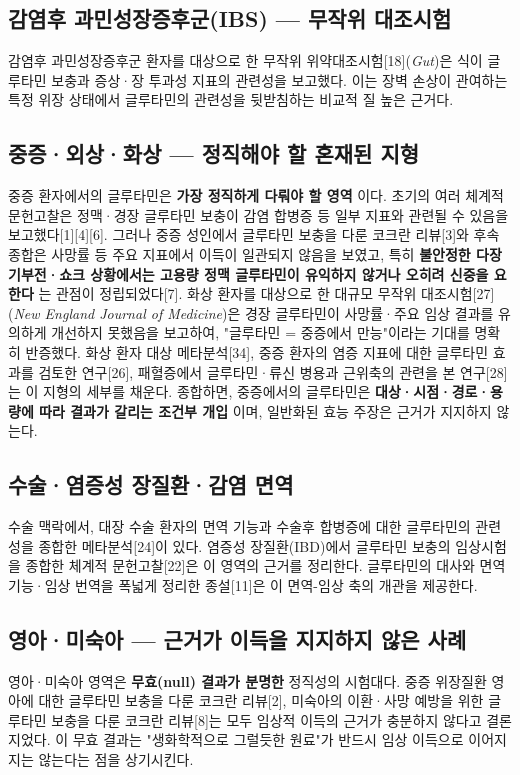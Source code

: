 \documentclass[11pt,oneside]{book}
\begin{document}
\subsection{감염후 과민성장증후군(IBS) — 무작위 대조시험}
감염후 과민성장증후군 환자를 대상으로 한 무작위 위약대조시험[18](\textit{Gut})은 식이 글루타민 보충과 증상·장 투과성 지표의 관련성을 보고했다. 이는 장벽 손상이 관여하는 특정 위장 상태에서 글루타민의 관련성을 뒷받침하는 비교적 질 높은 근거다.

\subsection{중증·외상·화상 — 정직해야 할 혼재된 지형}
중증 환자에서의 글루타민은 \textbf{가장 정직하게 다뤄야 할 영역} 이다. 초기의 여러 체계적 문헌고찰은 정맥·경장 글루타민 보충이 감염 합병증 등 일부 지표와 관련될 수 있음을 보고했다[1][4][6]. 그러나 중증 성인에서 글루타민 보충을 다룬 코크란 리뷰[3]와 후속 종합은 사망률 등 주요 지표에서 이득이 일관되지 않음을 보였고, 특히 \textbf{불안정한 다장기부전·쇼크 상황에서는 고용량 정맥 글루타민이 유익하지 않거나 오히려 신중을 요한다} 는 관점이 정립되었다[7]. 화상 환자를 대상으로 한 대규모 무작위 대조시험[27](\textit{New England Journal of Medicine})은 경장 글루타민이 사망률·주요 임상 결과를 유의하게 개선하지 못했음을 보고하여, "글루타민 = 중증에서 만능"이라는 기대를 명확히 반증했다. 화상 환자 대상 메타분석[34], 중증 환자의 염증 지표에 대한 글루타민 효과를 검토한 연구[26], 패혈증에서 글루타민·류신 병용과 근위축의 관련을 본 연구[28]는 이 지형의 세부를 채운다. 종합하면, 중증에서의 글루타민은 \textbf{대상·시점·경로·용량에 따라 결과가 갈리는 조건부 개입} 이며, 일반화된 효능 주장은 근거가 지지하지 않는다.

\subsection{수술·염증성 장질환·감염 면역}
수술 맥락에서, 대장 수술 환자의 면역 기능과 수술후 합병증에 대한 글루타민의 관련성을 종합한 메타분석[24]이 있다. 염증성 장질환(IBD)에서 글루타민 보충의 임상시험을 종합한 체계적 문헌고찰[22]은 이 영역의 근거를 정리한다. 글루타민의 대사와 면역 기능·임상 번역을 폭넓게 정리한 종설[11]은 이 면역-임상 축의 개관을 제공한다.

\subsection{영아·미숙아 — 근거가 이득을 지지하지 않은 사례}
영아·미숙아 영역은 \textbf{무효(null) 결과가 분명한} 정직성의 시험대다. 중증 위장질환 영아에 대한 글루타민 보충을 다룬 코크란 리뷰[2], 미숙아의 이환·사망 예방을 위한 글루타민 보충을 다룬 코크란 리뷰[8]는 모두 임상적 이득의 근거가 충분하지 않다고 결론지었다. 이 무효 결과는 "생화학적으로 그럴듯한 원료"가 반드시 임상 이득으로 이어지지는 않는다는 점을 상기시킨다.
\end{document}
